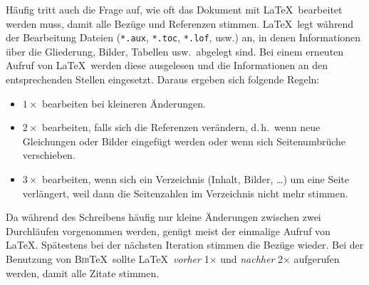 Häufig tritt auch die Frage auf, wie oft das Dokument mit \LaTeX\ bearbeitet
werden muss, damit alle Bezüge und Referenzen stimmen. \LaTeX\ legt während der
Bearbeitung Dateien (\verb|*.aux|, \verb|*.toc|, \verb|*.lof|, usw.) an, in
denen Informationen über die Gliederung, Bilder, Tabellen usw.\ abgelegt sind.
Bei einem erneuten Aufruf von \LaTeX\ werden diese ausgelesen und die
Informationen an den entsprechenden Stellen eingesetzt. Daraus ergeben sich
folgende Regeln:
\begin{itemize}
\item \textbf{$1\times$} bearbeiten bei kleineren Änderungen.
\item \textbf{$2\times$} bearbeiten, falls sich die Referenzen verändern,
   d.\,h.\ wenn neue Gleichungen oder Bilder eingefügt werden oder wenn sich
  Seitenumbrüche verschieben.
\item \textbf{$3\times$} bearbeiten, wenn sich ein Verzeichnis (Inhalt, Bilder,
  \ldots) um eine Seite verlängert, weil dann die Seitenzahlen im Verzeichnis
  nicht mehr stimmen.
\end{itemize}

Da während des Schreibens häufig nur kleine Änderungen zwischen zwei Durchläufen
vorgenommen werden, genügt meist der einmalige Aufruf von \LaTeX. Spätestens bei
der nächsten Iteration stimmen die Bezüge wieder. Bei der Benutzung von
\textsc{Bib}\TeX\ sollte \LaTeX\ \emph{vorher} 1$\times$ und \emph{nachher}
2$\times$ aufgerufen werden, damit alle Zitate stimmen.

